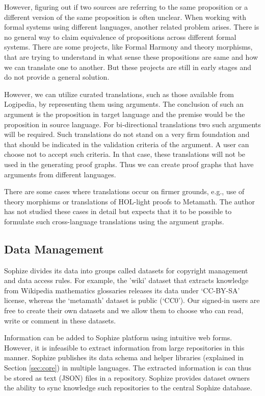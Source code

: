 \documentclass[a4paper]{article}
\begin{document}
However, figuring out if two sources are referring to the same proposition or a different version of the same proposition is often unclear. When working with formal systems using different languages, another related problem arises. There is no general way to claim equivalence of propositions across different formal systems. There are some projects, like Formal Harmony and theory morphisms, that are trying to understand in what sense these propositions are same and how we can translate one to another. But these projects are still in early stages and do not provide a general solution.

However, we can utilize curated translations, such as those available from Logipedia, by representing them using arguments. The conclusion of such an argument is the proposition in target language and the premise would be the proposition in source language. For bi-directional translations two such arguments will be required. Such translations do not stand on a very firm foundation and that should be indicated in the validation criteria of the argument. A user can choose not to accept such criteria. In that case, these translations will not be used in the generating proof graphs. Thus we can create proof graphs that have arguments from different languages.

There are some cases where translations occur on firmer grounds, e.g., use of theory morphisms or translations of HOL-light proofs to Metamath. The author has not studied these cases in detail but expects that it to be possible to formulate such cross-language translations using the argument graphs.

\subsection{Data Management}

Sophize divides its data into groups called datasets for copyright management and data access rules. For example, the 'wiki' dataset that extracts knowledge from Wikipedia mathematics glossaries releases its data under `CC-BY-SA' license, whereas the `metamath' dataset is public (`CC0'). Our signed-in users are free to create their own datasets and we allow them to choose who can read, write or comment in these datasets. 

Information can be added to Sophize platform using intuitive web forms. However, it is infeasible to extract information from large repositories in this manner. Sophize publishes its data schema and helper libraries (explained in Section \ref{sec:core}) in multiple languages. The extracted information is can thus be stored as text (JSON) files in a repository. Sophize provides dataset owners the ability to sync knowledge such repositories to the central Sophize database.
\end{document}
